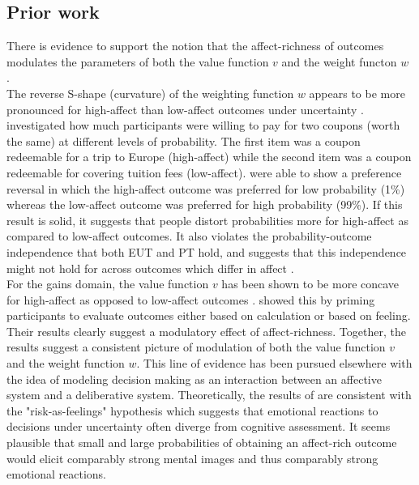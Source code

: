\documentclass[12pt]{article}
\begin{document}
\subsection{Prior work}

There is evidence to support
the notion that the affect-richness of outcomes modulates
the parameters of both the value function $v$
\autocite{hsee2004music} and the weight functon $w$
\autocite{
rottenstreich2001money}. \\

The reverse S-shape (curvature) of the weighting function
$w$ appears to be more pronounced
for high-affect than low-affect outcomes under
uncertainty \autocite{rottenstreich2001money}.
\textcite{rottenstreich2001money}
investigated how much participants were
willing to pay for two coupons
(worth the same) at different
levels of probability. The first item was
a coupon redeemable for a trip to
Europe (high-affect) while the second
item was a coupon redeemable for
covering tuition fees (low-affect).
\textcite{rottenstreich2001money}
were able to show a preference reversal in
which the high-affect outcome was preferred for
low probability (1\%) whereas the low-affect
outcome was preferred for high probability (99\%).
If this result is solid, it suggests
that people distort probabilities
more for high-affect as compared to low-affect
outcomes. It also violates the probability-outcome
independence that both EUT and PT hold,
and suggests that this independence might
not hold for across outcomes which differ
in affect \autocite{rottenstreich2001money}. \\

For the gains domain, the value function $v$
has been shown to be more
concave for high-affect as opposed to low-affect
outcomes \autocite{hsee2004music}.
\textcite{hsee2004music} showed this by
priming participants to
evaluate outcomes either based on calculation or
based on feeling. Their results clearly suggest
a modulatory effect of affect-richness.
Together, the results suggest a consistent picture
of modulation of both the value function $v$ and
the weight function  $w$. This line of evidence
has been pursued elsewhere \autocite{
	mukherjee2010dual,
mukherjee2011thinking} with the idea of modeling
decision making as an interaction between an
affective system and a deliberative system.
Theoretically, the results of
\textcite{rottenstreich2001money,
hsee2004music} are consistent with the
"risk-as-feelings" hypothesis \autocite{loewenstein2001risk}
which suggests that emotional reactions
to decisions under uncertainty often diverge
from cognitive assessment. It seems plausible
that small and large probabilities of obtaining an
affect-rich outcome would elicit
comparably strong mental images and thus
comparably strong emotional reactions.
\end{document}
